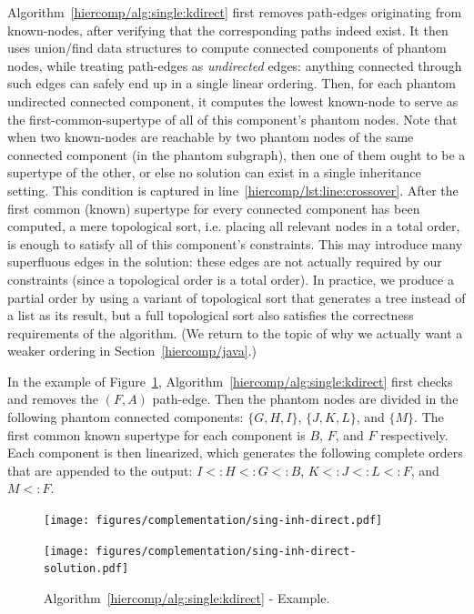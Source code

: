 Algorithm~\ref{hiercomp/alg:single:kdirect} first removes path-edges
originating from known-nodes, after verifying that the corresponding
paths indeed exist. It then uses union/find data structures to compute
connected components of phantom nodes, while treating path-edges
as \emph{undirected} edges: anything connected through such edges can
safely end up in a single linear ordering. Then, for each phantom
undirected connected component, it computes the lowest known-node to
serve as the first-common-supertype of all of this component's phantom
nodes. Note that when two known-nodes are reachable by two phantom
nodes of the same connected component (in the phantom subgraph), then
one of them ought to be a supertype of the other, or else no solution
can exist in a single inheritance setting. This condition is captured
in line~\ref{hiercomp/lst:line:crossover}. After the first common (known)
supertype for every connected component has been computed, a mere
topological sort, i.e. placing all relevant nodes in a total order, is
enough to satisfy all of this component's constraints. This may
introduce many superfluous edges in the solution: these edges are not
actually required by our constraints (since a topological order is a
total order). In practice, we produce a partial order by using a
variant of topological sort that generates a tree instead of a list as
its result, but a full topological sort also satisfies the correctness
requirements of the algorithm. (We return to the topic of why we
actually want a weaker ordering in Section~\ref{hiercomp/java}.)

In the example of Figure~\ref{hiercomp/fig:kdirect:ex},
Algorithm~\ref{hiercomp/alg:single:kdirect} first checks and removes the
$(F,A)$ path-edge. Then the phantom nodes are divided in the following
phantom connected components: $\{G,H,I\}$, $\{J,K,L\}$, and
$\{M\}$. The first common known supertype for each component is $B$,
$F$, and $F$ respectively. Each component is then linearized, which
generates the following complete orders that are appended to the
output: $I <: H <: G <: B$, $K <: J <: L <: F$, and $M <: F$.


\begin{figure}[t]
  \begin{minipage}[b]{.5\linewidth}
    \centering
    \texttt{[image: figures/complementation/sing-inh-direct.pdf]}
    \label{hiercomp/fig:stree1:simple}
  \end{minipage}
  \begin{minipage}[b]{.5\linewidth}
    \centering
    \texttt{[image: figures/complementation/sing-inh-direct-solution.pdf]}
    \label{hiercomp/fig:cgraph1:simple}
  \end{minipage}
  \caption[Single Inheritance Algorithm Example]{%
    Algorithm~\ref{hiercomp/alg:single:kdirect} - Example. }
  \label{hiercomp/fig:kdirect:ex}
\end{figure}

